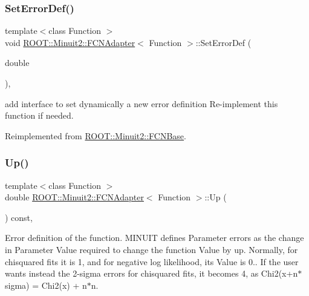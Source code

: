 \subsubsection{\texorpdfstring{SetErrorDef()}{SetErrorDef()}\hspace{0.1cm}{\footnotesize\ttfamily [2/2]}}
{\footnotesize\ttfamily template$<$class Function $>$ \\
void \mbox{\hyperlink{classROOT_1_1Minuit2_1_1FCNAdapter}{R\+O\+O\+T\+::\+Minuit2\+::\+F\+C\+N\+Adapter}}$<$ Function $>$\+::Set\+Error\+Def (\begin{DoxyParamCaption}\item[{double}]{ }\end{DoxyParamCaption})\hspace{0.3cm}{\ttfamily [inline]}, {\ttfamily [virtual]}}

add interface to set dynamically a new error definition Re-\/implement this function if needed. 

Reimplemented from \mbox{\hyperlink{classROOT_1_1Minuit2_1_1FCNBase_a840e02c2e6ef96eec289deca096b6088}{R\+O\+O\+T\+::\+Minuit2\+::\+F\+C\+N\+Base}}.

\mbox{\label{classROOT_1_1Minuit2_1_1FCNAdapter_a3bcb29efda3b97c17bb17512c1629365}} 
\subsubsection{\texorpdfstring{Up()}{Up()}\hspace{0.1cm}{\footnotesize\ttfamily [1/2]}}
{\footnotesize\ttfamily template$<$class Function $>$ \\
double \mbox{\hyperlink{classROOT_1_1Minuit2_1_1FCNAdapter}{R\+O\+O\+T\+::\+Minuit2\+::\+F\+C\+N\+Adapter}}$<$ Function $>$\+::Up (\begin{DoxyParamCaption}{ }\end{DoxyParamCaption}) const\hspace{0.3cm}{\ttfamily [inline]}, {\ttfamily [virtual]}}

Error definition of the function. M\+I\+N\+U\+IT defines Parameter errors as the change in Parameter Value required to change the function Value by up. Normally, for chisquared fits it is 1, and for negative log likelihood, its Value is 0.. If the user wants instead the 2-\/sigma errors for chisquared fits, it becomes 4, as Chi2(x+n$\ast$sigma) = Chi2(x) + n$\ast$n.

